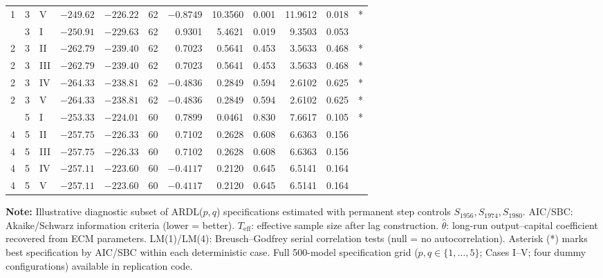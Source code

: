 \begin{landscape}
\begin{longtable}[t]{rrlrrrrrrrll}
1 & 3 & V & $-249.62$ & $-226.22$ & 62 & $-0.8749$ & 10.3560 & 0.001 & 11.9612 & 0.018 & * \\
\addlinespace
2 & 3 & I & $-250.91$ & $-229.63$ & 62 & 0.9301 & 5.4621 & 0.019 & 9.3503 & 0.053 & \\
2 & 3 & II & $-262.79$ & $-239.40$ & 62 & 0.7023 & 0.5641 & 0.453 & 3.5633 & 0.468 & * \\
2 & 3 & III & $-262.79$ & $-239.40$ & 62 & 0.7023 & 0.5641 & 0.453 & 3.5633 & 0.468 & * \\
2 & 3 & IV & $-264.33$ & $-238.81$ & 62 & $-0.4836$ & 0.2849 & 0.594 & 2.6102 & 0.625 & * \\
2 & 3 & V & $-264.33$ & $-238.81$ & 62 & $-0.4836$ & 0.2849 & 0.594 & 2.6102 & 0.625 & * \\
\addlinespace
4 & 5 & I & $-253.33$ & $-224.01$ & 60 & 0.7899 & 0.0461 & 0.830 & 7.6617 & 0.105 & * \\
4 & 5 & II & $-257.75$ & $-226.33$ & 60 & 0.7102 & 0.2628 & 0.608 & 6.6363 & 0.156 & \\
4 & 5 & III & $-257.75$ & $-226.33$ & 60 & 0.7102 & 0.2628 & 0.608 & 6.6363 & 0.156 & \\
4 & 5 & IV & $-257.11$ & $-223.60$ & 60 & $-0.4117$ & 0.2120 & 0.645 & 6.5141 & 0.164 & \\
4 & 5 & V & $-257.11$ & $-223.60$ & 60 & $-0.4117$ & 0.2120 & 0.645 & 6.5141 & 0.164 & \\
\bottomrule
\end{longtable}
\noindent\footnotesize\textbf{Note:} Illustrative diagnostic subset of ARDL($p,q$) specifications estimated with permanent step controls $S_{1956}, S_{1974}, S_{1980}$. AIC/SBC: Akaike/Schwarz information criteria (lower = better). $T_{\text{eff}}$: effective sample size after lag construction. $\hat{\theta}$: long-run output--capital coefficient recovered from ECM parameters. LM(1)/LM(4): Breusch--Godfrey serial correlation tests (null = no autocorrelation). Asterisk (*) marks best specification by AIC/SBC within each deterministic case. Full 500-model specification grid ($p,q \in \{1,\dots,5\}$; Cases I--V; four dummy configurations) available in replication code.
\end{landscape}
